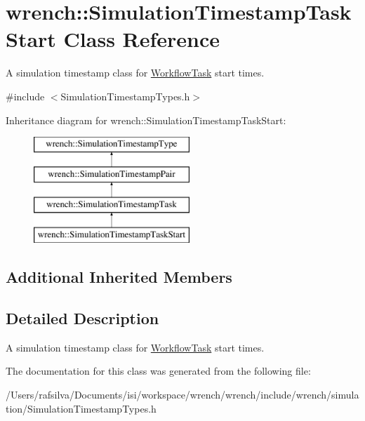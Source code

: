 \hypertarget{classwrench_1_1_simulation_timestamp_task_start}{}\section{wrench\+:\+:Simulation\+Timestamp\+Task\+Start Class Reference}
\label{classwrench_1_1_simulation_timestamp_task_start}


A simulation timestamp class for \hyperlink{classwrench_1_1_workflow_task}{Workflow\+Task} start times.  




{\ttfamily \#include $<$Simulation\+Timestamp\+Types.\+h$>$}

Inheritance diagram for wrench\+:\+:Simulation\+Timestamp\+Task\+Start\+:\begin{figure}[H]
\begin{center}
\leavevmode
\includegraphics[height=4.000000cm]{classwrench_1_1_simulation_timestamp_task_start}
\end{center}
\end{figure}
\subsection*{Additional Inherited Members}


\subsection{Detailed Description}
A simulation timestamp class for \hyperlink{classwrench_1_1_workflow_task}{Workflow\+Task} start times. 

The documentation for this class was generated from the following file\+:\begin{DoxyCompactItemize}
\item 
/\+Users/rafsilva/\+Documents/isi/workspace/wrench/wrench/include/wrench/simulation/Simulation\+Timestamp\+Types.\+h\end{DoxyCompactItemize}

